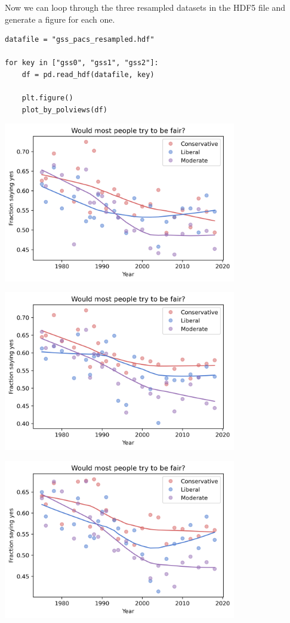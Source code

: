 Now we can loop through the three resampled datasets in the HDF5 file
and generate a figure for each one.

\begin{lstlisting}[]
datafile = "gss_pacs_resampled.hdf"

for key in ["gss0", "gss1", "gss2"]:
    df = pd.read_hdf(datafile, key)

    plt.figure()
    plot_by_polviews(df)
\end{lstlisting}

\begin{center}
\includegraphics[width=4in]{chapters/03_outlook_files/03_outlook_59_0.png}
\end{center}

\begin{center}
\includegraphics[width=4in]{chapters/03_outlook_files/03_outlook_59_1.png}
\end{center}

\begin{center}
\includegraphics[width=4in]{chapters/03_outlook_files/03_outlook_59_2.png}
\end{center}

